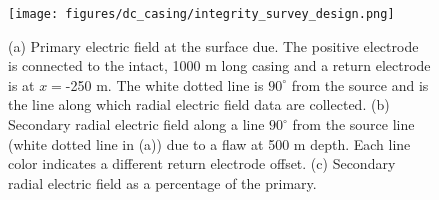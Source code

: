 \begin{figure}
    \begin{center}
    \texttt{[image: figures/dc\_casing/integrity\_survey\_design.png]}
    \end{center}
\caption{
    (a) Primary electric field at the surface due.
    The positive electrode is connected to the intact,
    1000 m long casing and a return electrode is at $x=$-250 m. The white dotted
    line is $90^\circ$ from the source and is the line along which radial electric field
    data are collected.
    (b) Secondary radial electric field along a line $90^{\circ}$ from the source line (white dotted line in (a))
    due to a flaw at 500 m depth. Each line color indicates a different return electrode offset.
    (c) Secondary radial electric field as a percentage of the primary.
}
\label{fig:integrity_survey_design}
\end{figure}
